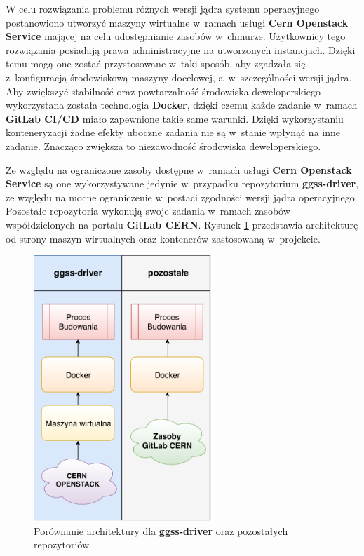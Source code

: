 W celu rozwiązania problemu różnych wersji jądra systemu operacyjnego postanowiono utworzyć maszyny wirtualne w~ramach usługi \textbf{Cern Openstack Service} mającej na celu udostępnianie zasobów w~chmurze. Użytkownicy tego rozwiązania posiadają prawa administracyjne na utworzonych instancjach. Dzięki temu mogą one zostać przystosowane w~taki sposób, aby zgadzała się z~konfiguracją środowiskową maszyny docelowej, a~w~szczególności wersji jądra. Aby zwiększyć stabilność oraz powtarzalność środowiska deweloperskiego wykorzystana została technologia \textbf{Docker}, dzięki czemu każde zadanie w~ramach \textbf{GitLab CI/CD} miało zapewnione takie same warunki. Dzięki wykorzystaniu konteneryzacji żadne efekty uboczne zadania nie są w~stanie wpłynąć na inne zadanie. Znacząco zwiększa to niezawodność środowiska deweloperskiego.

Ze względu na ograniczone zasoby dostępne w~ramach usługi \textbf{Cern Openstack Service} są one wykorzystywane jedynie w~przypadku repozytorium \textbf{ggss-driver}, ze względu na mocne ograniczenie w~postaci zgodności wersji jądra operacyjnego. Pozostałe repozytoria wykonują swoje zadania w~ramach zasobów współdzielonych na portalu \textbf{GitLab CERN}. Rysunek \ref{fig:buildComp} przedstawia architekturę od strony maszyn wirtualnych oraz kontenerów zastosowaną w~projekcie.

\newpage

\begin{figure}[H]
\centering
\includegraphics[width=0.6\textwidth]{res/buildComp}
\caption{Porównanie architektury dla \textbf{ggss-driver} oraz pozostałych repozytoriów}
\label{fig:buildComp}
\end{figure}

